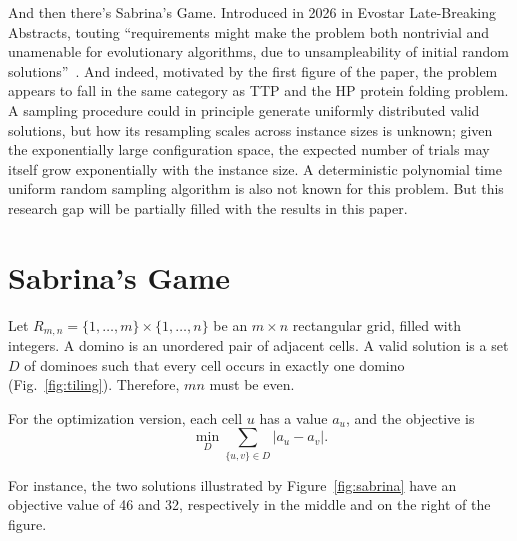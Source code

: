 \documentclass[svgnames,table,runningheads]{llncs}
\begin{document}
And then there's Sabrina's Game. Introduced in 2026 in Evostar Late-Breaking Abstracts, touting ``requirements might make the problem both nontrivial and unamenable
for evolutionary algorithms, due to unsampleability of initial random solutions''~\cite{SabrinasGame2026}. And indeed, motivated by the first figure of the paper, the problem appears to fall in the same category as TTP and the HP protein folding problem. A sampling procedure could in principle generate uniformly distributed valid solutions, but how its resampling scales across instance sizes is unknown; given the exponentially large configuration space, the expected number of trials may itself grow exponentially with the instance size. A deterministic polynomial time uniform random sampling algorithm is also not known for this problem. But this research gap will be partially filled with the results in this paper.

\section{Sabrina's Game}
\label{sec:game}

Let $R_{m,n}=\{1,\ldots,m\}\times\{1,\ldots,n\}$ be an $m\times n$ rectangular grid, filled with integers. A domino is an unordered pair of adjacent cells. A valid solution is a set $D$ of dominoes such that every cell occurs in exactly one domino (Fig.~\ref{fig:tiling}). Therefore, $mn$ must be even.

For the optimization version, each cell $u$ has a value $a_u$, and the objective is
\begin{equation}
  \min_{D} \sum_{\{u,v\}\in D}|a_u-a_v|.
\end{equation}

For instance, the two solutions illustrated by Figure~\ref{fig:sabrina} have an objective value of 46 and 32, respectively in the middle and on the right of the figure.
\end{document}
